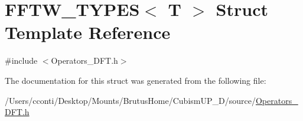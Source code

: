 \hypertarget{struct_f_f_t_w___t_y_p_e_s}{}\section{F\+F\+T\+W\+\_\+\+T\+Y\+P\+E\+S$<$ T $>$ Struct Template Reference}
\label{struct_f_f_t_w___t_y_p_e_s}


{\ttfamily \#include $<$Operators\+\_\+\+D\+F\+T.\+h$>$}



The documentation for this struct was generated from the following file\+:\begin{DoxyCompactItemize}
\item 
/\+Users/cconti/\+Desktop/\+Mounts/\+Brutus\+Home/\+Cubism\+U\+P\+\_\+D/source/\hyperlink{_operators___d_f_t_8h}{Operators\+\_\+\+D\+F\+T.\+h}\end{DoxyCompactItemize}
